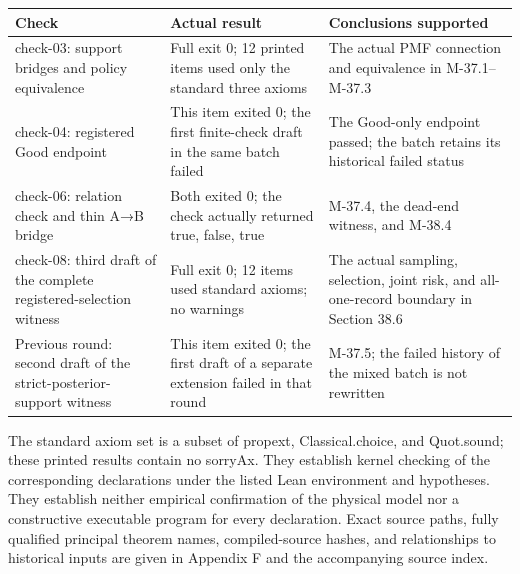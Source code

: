 \documentclass[
  english,
  11pt,
  oneside]{book}
\newcounter{none} %
\begin{document}
{\def\LTcaptype{none} %
\begin{longtable}[]{@{}
  >{\raggedright\arraybackslash}p{}
  >{\raggedright\arraybackslash}p{}
  >{\raggedright\arraybackslash}p{}@{}}
\toprule\noalign{}
\begin{minipage}[b]{\linewidth}\raggedright
Check
\end{minipage} & \begin{minipage}[b]{\linewidth}\raggedright
Actual result
\end{minipage} & \begin{minipage}[b]{\linewidth}\raggedright
Conclusions supported
\end{minipage} \\
\midrule\noalign{}
\endhead
\bottomrule\noalign{}
\endlastfoot
check-03: support bridges and policy equivalence & Full exit 0; 12 printed items used only the standard three axioms & The actual PMF connection and equivalence in M-37.1--M-37.3 \\
check-04: registered Good endpoint & This item exited 0; the first finite-check draft in the same batch failed & The Good-only endpoint passed; the batch retains its historical failed status \\
check-06: relation check and thin A→B bridge & Both exited 0; the check actually returned true, false, true & M-37.4, the dead-end witness, and M-38.4 \\
check-08: third draft of the complete registered-selection witness & Full exit 0; 12 items used standard axioms; no warnings & The actual sampling, selection, joint risk, and all-one-record boundary in Section 38.6 \\
Previous round: second draft of the strict-posterior-support witness & This item exited 0; the first draft of a separate extension failed in that round & M-37.5; the failed history of the mixed batch is not rewritten \\
\end{longtable}
}

The standard axiom set is a subset of propext, Classical.choice, and Quot.sound; these printed results contain no sorryAx. They establish kernel checking of the corresponding declarations under the listed Lean environment and hypotheses. They establish neither empirical confirmation of the physical model nor a constructive executable program for every declaration. Exact source paths, fully qualified principal theorem names, compiled-source hashes, and relationships to historical inputs are given in Appendix F and the accompanying source index.
\end{document}
